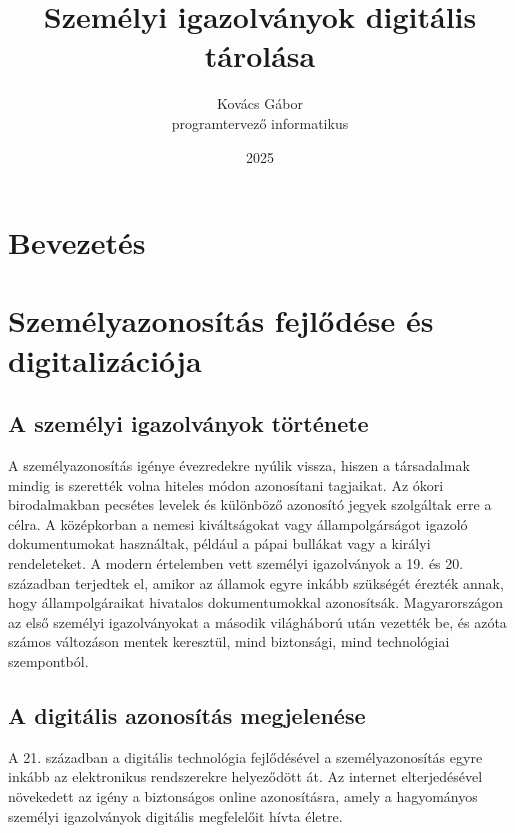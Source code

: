 \documentclass[
]{thesis-ekf}
\theoremstyle{definition}
\theoremstyle{remark}
\begin{document}
	
	\title{Személyi igazolványok digitális tárolása}
	\author{Kovács Gábor\\programtervező informatikus}
	\date{2025}
	\maketitle
	
	\tableofcontents
	
	\chapter*{Bevezetés}
	
	\chapter{Személyazonosítás fejlődése és digitalizációja}
	
	\section{A személyi igazolványok története}
	A személyazonosítás igénye évezredekre nyúlik vissza, hiszen a társadalmak mindig is szerették volna hiteles módon azonosítani tagjaikat. Az ókori birodalmakban pecsétes levelek és különböző azonosító jegyek szolgáltak erre a célra. A középkorban a nemesi kiváltságokat vagy állampolgárságot igazoló dokumentumokat használtak, például a pápai bullákat vagy a királyi rendeleteket.
	A modern értelemben vett személyi igazolványok a 19. és 20. században terjedtek el, amikor az államok egyre inkább szükségét érezték annak, hogy állampolgáraikat hivatalos dokumentumokkal azonosítsák. Magyarországon az első személyi igazolványokat a második világháború után vezették be, és azóta számos változáson mentek keresztül, mind biztonsági, mind technológiai szempontból.
	
	\section{A digitális azonosítás megjelenése}
	A 21. században a digitális technológia fejlődésével a személyazonosítás egyre inkább az elektronikus rendszerekre helyeződött át. Az internet elterjedésével növekedett az igény a biztonságos online azonosításra, amely a hagyományos személyi igazolványok digitális megfelelőit hívta életre.
	
\end{document}

